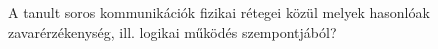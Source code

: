 \begin{example}

A tanult soros kommunikációk fizikai rétegei közül melyek hasonlóak zavarérzékenység, ill. logikai működés szempontjából?


\end{example}